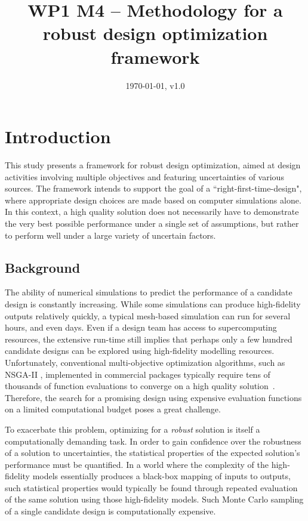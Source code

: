 \documentclass[a4paper]{article}
\begin{document}
\title{WP1 M4 -- Methodology for a robust design optimization framework}
\date{\today, v1.0}
\maketitle

\setcounter{tocdepth}{3}
\tableofcontents

\section{Introduction}
This study presents a framework for robust design optimization, aimed at design activities involving multiple objectives and featuring uncertainties of various sources.
The framework intends to support the goal of a ``right-first-time-design", where appropriate design choices are made based on computer simulations alone.
In this context, a high quality solution does not necessarily have to demonstrate the very best possible performance under a single set of assumptions, but rather to perform well under a large variety of uncertain factors.

\subsection{Background}
The ability of numerical simulations to predict the performance of a candidate design is constantly increasing. While some simulations can produce high-fidelity outputs relatively quickly, a typical mesh-based simulation can run for several hours, and even days. Even if a design team has access to supercomputing resources, the extensive run-time still implies that perhaps only a few hundred candidate designs can be explored using high-fidelity modelling resources. Unfortunately, conventional multi-objective optimization algorithms, such as NSGA-II \cite{deb2002fast}, implemented in commercial packages typically require tens of thousands of function evaluations to converge on a high quality solution~\cite{Hansen2010Comparing,Zhou2011Multiobjective}. Therefore, the search for a promising design using expensive evaluation functions on a limited computational budget poses a great challenge.

To exacerbate this problem, optimizing for a \emph{robust} solution is itself a computationally demanding task. In order to gain confidence over the robustness of a solution to uncertainties, the statistical properties of the expected solution's performance must be quantified. In a world where the complexity of the high-fidelity models essentially produces a black-box mapping of inputs to outputs, such statistical properties would typically be found through repeated evaluation of the same solution using those high-fidelity models. Such Monte Carlo sampling of a single candidate design is computationally expensive.
\end{document}
